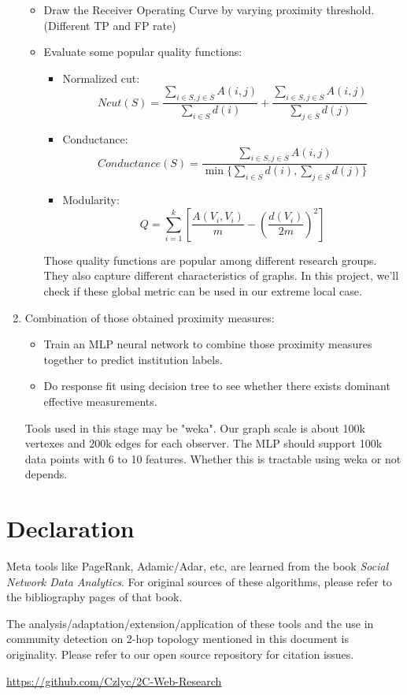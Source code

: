 \documentclass[11pt,a4paper]{article}
\begin{document}
\begin{enumerate}
\begin{itemize}
			\item Draw the Receiver Operating Curve by varying proximity threshold. 
			(Different TP and FP rate)
			\item Evaluate some popular quality functions:
				\begin{itemize}
					\item Normalized cut:
					\begin{equation}
						Ncut(S)=\frac{\sum_{i \in S, j \in \overline{S}}{A(i,j)}}
						{\sum_{i \in S}{d(i)}}
						+ \frac{\sum_{i \in S, j \in \overline{S}}{A(i,j)}}
						{\sum_{j \in \overline{S}}{d(j)}}						
					\end{equation}
					\item Conductance:
					\begin{equation}
						Conductance(S)=\frac{\sum_{i \in S, j \in \overline{S}}{A(i,j)}}
						{\min \{ \sum_{i \in S}{d(i)}, \sum_{j \in \overline{S}}{d(j)}\}}				
					\end{equation}
					\item Modularity:
					\begin{equation}
						Q=\sum_{i=1}^{k}{\left[ 
						\frac{A(V_i,V_i)}{m} 
						-\left( \frac{d(V_i)}{2m}\right)^2
						\right]}
					\end{equation}
				\end{itemize}
				Those quality functions are popular among different research 
				groups. They also capture different characteristics of graphs. 
				In this project, we'll check if these global metric can 
				be used in our extreme local case. 
		\end{itemize}
	\item Combination of those obtained proximity measures:
		\begin{itemize}
			\item Train an MLP neural network to combine those proximity measures
			together to predict institution labels. 
			\item Do response fit using decision tree to see whether there exists 
			dominant effective measurements. 
		\end{itemize}
		Tools used in this stage may be "weka". Our graph scale is about 100k vertexes
		and 200k edges for each observer. The MLP should support 100k data points with 
		6 to 10 features. Whether this is tractable using weka or not depends. 
\end{enumerate}

\section{Declaration}

Meta tools like PageRank, Adamic/Adar, etc, are learned from the book
\textit{Social Network Data Analytics}. For original sources of these 
algorithms, please refer to the bibliography pages of that book.

The analysis/adaptation/extension/application of these tools and 
the use in community detection on 2-hop topology mentioned 
in this document is originality. Please refer to our open source 
repository for citation issues.

\url{https://github.com/Czlyc/2C-Web-Research}
\end{document}
